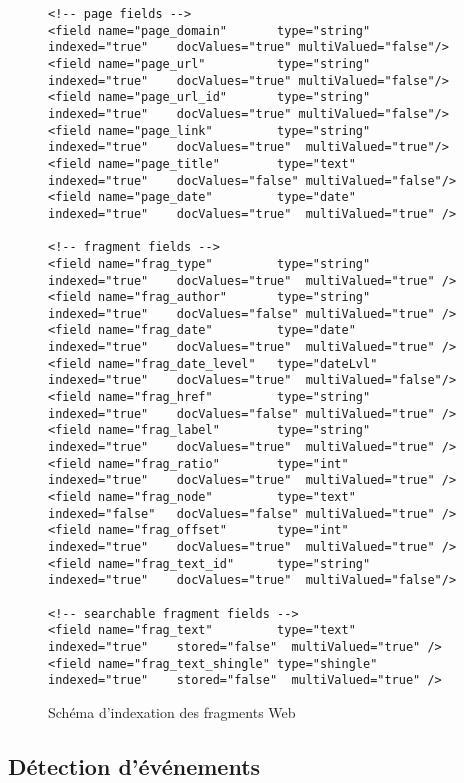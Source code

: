 \documentclass[symmetric,justified,marginals=raggedouter]{tufte-book}
\begin{document}
\newpage

\begin{figure*}
\small
\begin{verbatim}
<!-- page fields -->
<field name="page_domain"       type="string"  indexed="true"    docValues="true" multiValued="false"/>
<field name="page_url"          type="string"  indexed="true"    docValues="true" multiValued="false"/>
<field name="page_url_id"       type="string"  indexed="true"    docValues="true" multiValued="false"/>      
<field name="page_link"         type="string"  indexed="true"    docValues="true"  multiValued="true"/>      
<field name="page_title"        type="text"    indexed="true"    docValues="false" multiValued="false"/>
<field name="page_date"         type="date"    indexed="true"    docValues="true"  multiValued="true" />

<!-- fragment fields -->
<field name="frag_type"         type="string"  indexed="true"    docValues="true"  multiValued="true" />    
<field name="frag_author"       type="string"  indexed="true"    docValues="false" multiValued="true" />
<field name="frag_date"         type="date"    indexed="true"    docValues="true"  multiValued="true" />
<field name="frag_date_level"   type="dateLvl" indexed="true"    docValues="true"  multiValued="false"/> 
<field name="frag_href"         type="string"  indexed="true"    docValues="false" multiValued="true" />
<field name="frag_label"        type="string"  indexed="true"    docValues="true"  multiValued="true" />
<field name="frag_ratio"        type="int"     indexed="true"    docValues="true"  multiValued="true" />
<field name="frag_node"         type="text"    indexed="false"   docValues="false" multiValued="true" />  
<field name="frag_offset"       type="int"     indexed="true"    docValues="true"  multiValued="true" />
<field name="frag_text_id"      type="string"  indexed="true"    docValues="true"  multiValued="false"/>

<!-- searchable fragment fields -->
<field name="frag_text"         type="text"    indexed="true"    stored="false"  multiValued="true" />
<field name="frag_text_shingle" type="shingle" indexed="true"    stored="false"  multiValued="true" />   
\end{verbatim} 
\caption{Schéma d'indexation des fragments Web}
\label{fig:schema_2}
\end{figure*}

\subsection{Détection d'événements}
\end{document}
